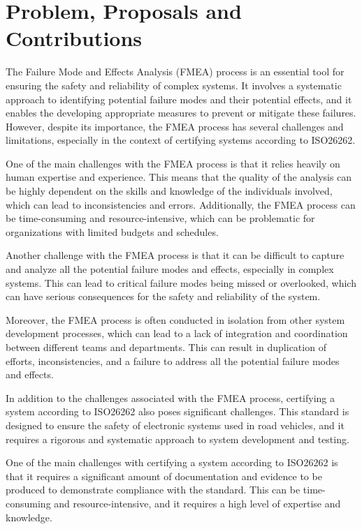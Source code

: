 \documentclass[./dissertation.tex]{subfiles}
\begin{document}
\newpage\null\thispagestyle{empty}\newpage
\chapter{Problem, Proposals and Contributions}
The Failure Mode and Effects Analysis (FMEA) process is an essential tool for ensuring the safety and reliability of complex systems. It involves a systematic approach to identifying potential failure modes and their potential effects, and it enables the developing appropriate measures to prevent or mitigate these failures. However, despite its importance, the FMEA process has several challenges and limitations, especially in the context of certifying systems according to ISO26262.

One of the main challenges with the FMEA process is that it relies heavily on human expertise and experience. This means that the quality of the analysis can be highly dependent on the skills and knowledge of the individuals involved, which can lead to inconsistencies and errors. Additionally, the FMEA process can be time-consuming and resource-intensive, which can be problematic for organizations with limited budgets and schedules.

Another challenge with the FMEA process is that it can be difficult to capture and analyze all the potential failure modes and effects, especially in complex systems. This can lead to critical failure modes being missed or overlooked, which can have serious consequences for the safety and reliability of the system.

Moreover, the FMEA process is often conducted in isolation from other system development processes, which can lead to a lack of integration and coordination between different teams and departments. This can result in duplication of efforts, inconsistencies, and a failure to address all the potential failure modes and effects.

In addition to the challenges associated with the FMEA process, certifying a system according to ISO26262 also poses significant challenges. This standard is designed to ensure the safety of electronic systems used in road vehicles, and it requires a rigorous and systematic approach to system development and testing.

One of the main challenges with certifying a system according to ISO26262 is that it requires a significant amount of documentation and evidence to be produced to demonstrate compliance with the standard. This can be time-consuming and resource-intensive, and it requires a high level of expertise and knowledge.
\end{document}
